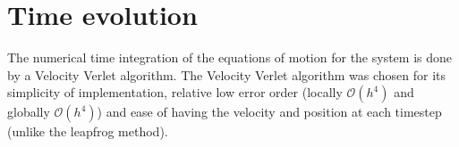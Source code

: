 \section{Time evolution}
The numerical time integration of the equations of motion for the system is done by a Velocity Verlet algorithm. The Velocity Verlet algorithm was chosen for its simplicity of implementation, relative low error order (locally $\mathcal{O}(h^4)$ and globally $\mathcal{O}(h^4)$) and ease of having the velocity and position at each timestep (unlike the leapfrog method).